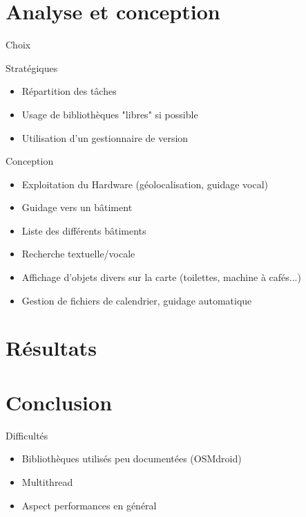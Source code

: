 \documentclass{beamer}
\begin{document}
		\section{Analyse et conception}
		\begin{frame}{Choix}
				\begin{block}{Stratégiques}
				\begin{itemize}
					\item Répartition des tâches
					\item Usage de bibliothèques "libres" si possible
					\item Utilisation d'un gestionnaire de version
				\end{itemize}
				\end{block}
		
				\pause
				\begin{block}{Conception}
				\begin{itemize}
					\item Exploitation du Hardware (géolocalisation, guidage vocal)
					\item Guidage vers un bâtiment
					\item Liste des différents bâtiments
					\item Recherche textuelle/vocale
					\item Affichage d'objets divers sur la carte (toilettes, machine à cafés...)
					\item Gestion de fichiers de calendrier, guidage automatique
				\end{itemize}
				\end{block}
		\end{frame}

	\section{Résultats}
	
	\section{Conclusion}
		\begin{frame}{Difficultés}
			\begin{itemize}
				\item Bibliothèques utilisés peu documentées (OSMdroid)
				\item Multithread
				\item Aspect performances en général
			\end{itemize}
		\end{frame}
		
\end{document}
